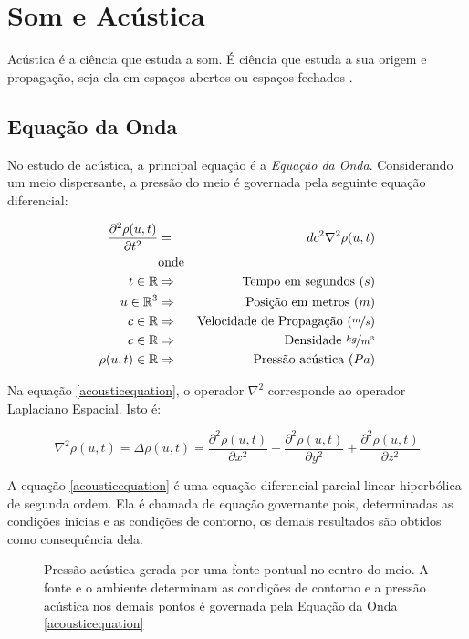 \section{Som e Acústica}

Acústica é a ciência que estuda a som. É ciência que estuda a sua origem e propagação, seja ela em espaços abertos ou espaços fechados \cite{kuttruff2007acoustics}.

\subsection{Equação da Onda}

No estudo de acústica, a principal equação é a \emph{Equação da Onda}. Considerando um meio dispersante, a pressão do meio é governada pela seguinte equação diferencial:

\begin{eqnarray}
\frac{\partial^2 \rho(u, t)}{\partial t^2} &=& dc^2 \nabla^2 \rho(u, t)\label{acousticequation} \\
&\text{onde}&\nonumber\\
t \in \mathbb{R} &\Rightarrow& \text{Tempo em segundos }(s) \nonumber\\
u \in \mathbb{R}^3 &\Rightarrow& \text{Posição em metros }(m) \nonumber\\
c \in \mathbb{R} &\Rightarrow& \text{Velocidade de Propagação }(\nicefrac{m}{s}) \nonumber\\
c \in \mathbb{R} &\Rightarrow& \text{Densidade } \nicefrac{kg}{m^3} \nonumber\\
\rho(u, t) \in \mathbb{R} &\Rightarrow& \text{Pressão acústica }(Pa) \nonumber
\end{eqnarray}

Na equação \eqref{acousticequation}, o operador $\nabla^2$ corresponde ao operador Laplaciano Espacial. Isto é:

\begin{equation}
	\nabla^2 \rho(u, t) = \Delta \rho(u, t) = \frac{\partial^2 \rho(u, t)}{\partial x^2} + \frac{\partial^2 \rho(u, t)}{\partial y^2} + \frac{\partial^2 \rho(u, t)}{\partial z^2}
\end{equation}

A equação \eqref{acousticequation} é uma equação diferencial parcial linear hiperbólica de segunda ordem. Ela é chamada de equação governante pois, determinadas as condições inicias e as condições de contorno, os demais resultados são obtidos como consequência dela.

\begin{figure}[ht]
	\centering
	
	\caption[Pressão acústica gerada uma fonte pontual]{Pressão acústica gerada por uma fonte pontual no centro do meio. A fonte e o ambiente determinam as condições de contorno e a pressão acústica nos demais pontos é governada pela Equação da Onda \eqref{acousticequation}}\label{wavefield}
\end{figure}

